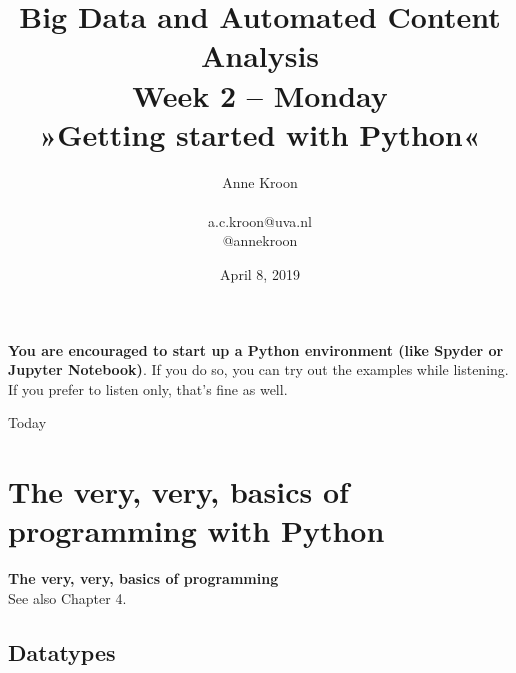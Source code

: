 \documentclass{beamer}
\begin{document}
\title[Big Data and Automated Content Analysis]{\textbf{Big Data and Automated Content Analysis} \\ Week 2 -- Monday\\ »Getting started with Python«}
\author[Anne Kroon]{Anne Kroon \\ ~ \\ \footnotesize{a.c.kroon@uva.nl \\@annekroon} \\}
\date{April 8, 2019}


\begin{frame}[plain]
\huge{\textbf{You are encouraged to start up a Python environment (like Spyder or Jupyter Notebook)}. If you do so, you can try out the examples while listening. If you prefer to listen only, that's fine as well.}
\end{frame}


\begin{frame}{}
\titlepage
\end{frame}

\begin{frame}{Today}
\tableofcontents
\end{frame}


\section[Basics]{The very, very, basics of programming with Python}
\begin{frame}[plain]
\textbf{The very, very, basics of programming}\\
\vspace{1cm}
See also Chapter 4.
\end{frame}
\subsection{Datatypes}
\end{document}
